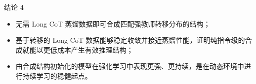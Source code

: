 \begin{TakeawayBox}{结论 4}
\begin{itemize}[leftmargin=16pt, itemsep=0pt, topsep=0pt]
    \item \method 无需 Long CoT 蒸馏数据即可合成匹配强教师转移分布的结构；
    \item 基于转移的 Long CoT 数据能够稳定收敛并接近蒸馏性能，证明纯指令级的合成就能以更低成本产生有效推理结构；
    \item 由合成结构初始化的模型在强化学习中表现更强、更持续，是在动态环境中进行持续学习的稳健起点。
\end{itemize} 
\end{TakeawayBox}
